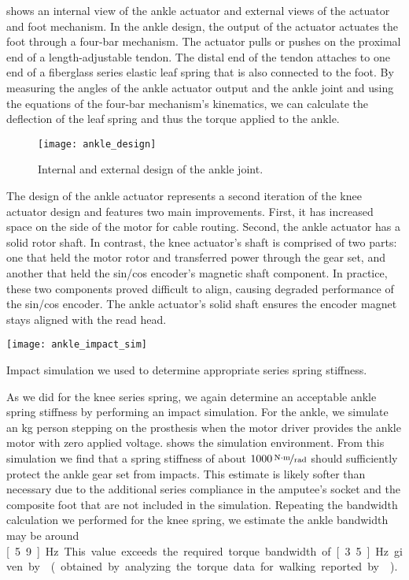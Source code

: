  shows an internal view of the ankle actuator and
external views of the actuator and foot mechanism. In the ankle design, the
output of the actuator actuates the foot through a four-bar mechanism. The
actuator pulls or pushes on the proximal end of a length-adjustable tendon. The
distal end of the tendon attaches to one end of a fiberglass series elastic leaf
spring that is also connected to the foot. By measuring the angles of the ankle
actuator output and the ankle joint and using the equations of the four-bar
mechanism's kinematics, we can calculate the deflection of the leaf spring and
thus the torque applied to the ankle.
\begin{figure*}[b!]
    \centering 
    \texttt{[image: ankle\_design]}
    \caption{Internal and external design of the ankle 
    joint.}\label{fig:ankle_design}
\end{figure*}

The design of the ankle actuator represents a second iteration of the knee
actuator design and features two main improvements.  First, it has increased
space on the side of the motor for cable routing. Second, the ankle actuator has
a solid rotor shaft. In contrast, the knee actuator's shaft is comprised of two
parts: one that held the motor rotor and transferred power through the gear set,
and another that held the sin/cos encoder's magnetic shaft component. In
practice, these two components proved difficult to align, causing degraded
performance of the sin/cos encoder. The ankle actuator's solid shaft ensures the
encoder magnet stays aligned with the read head.

\begin{marginfigure}[-0.0in]
    \centering 
    \texttt{[image: ankle\_impact\_sim]}
    \caption{Impact simulation we used to determine appropriate series spring
    stiffness.}\label{fig:ankle_impact_sim}
\end{marginfigure}
As we did for the knee series spring, we again determine an acceptable ankle
spring stiffness by performing an impact simulation. For the ankle, we simulate
an \unit[80]{kg} person stepping on the prosthesis when the motor driver
provides the ankle motor with zero applied voltage. 
shows the simulation environment. From this simulation we find that a spring
stiffness of about $\unitfrac[1000]{N \cdot m}{rad}$ should sufficiently protect
the ankle gear set from impacts. This estimate is likely softer than necessary
due to the additional series compliance in the amputee's socket and the
composite foot that are not included in the simulation.
Repeating the bandwidth calculation we performed for the knee spring, we
estimate the ankle bandwidth may be around \unit[5.9]{Hz}. This value exceeds
the required torque bandwidth of \unit[3.5]{Hz} given by \citet{au2008powered}
(obtained by analyzing the torque data for walking reported by
\citet{winter2009biomechanics}).

